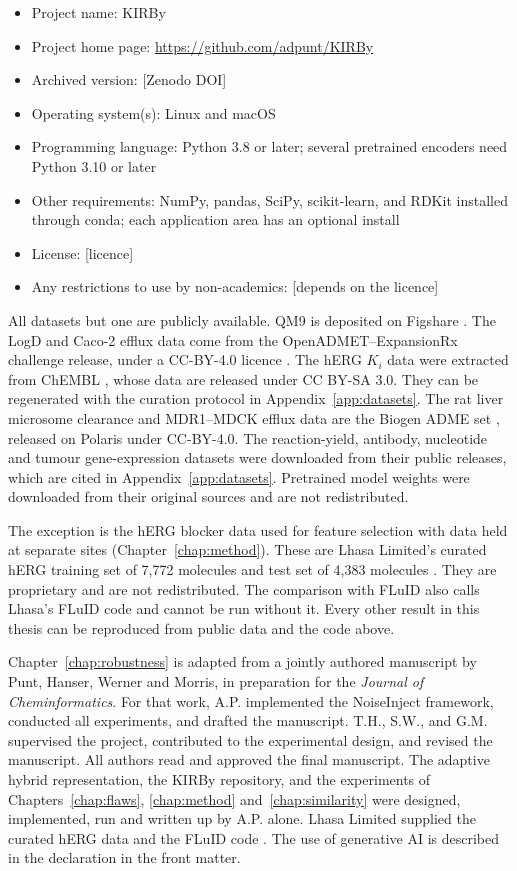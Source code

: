 \begin{itemize}
    \item Project name: KIRBy
    \item Project home page: \url{https://github.com/adpunt/KIRBy}
    \item Archived version: [Zenodo DOI]
    \item Operating system(s): Linux and macOS
    \item Programming language: Python 3.8 or later; several pretrained encoders need Python 3.10 or later
    \item Other requirements: NumPy, pandas, SciPy, scikit-learn, and RDKit installed through conda; each application area has an optional install
    \item License: [licence]
    \item Any restrictions to use by non-academics: [depends on the licence]
\end{itemize}


All datasets but one are publicly available. QM9 \citep{Ramakrishnan2014} is deposited on Figshare \citep{qm9_dataset}. The LogD and Caco-2 efflux data come from the OpenADMET--ExpansionRx challenge release, under a CC-BY-4.0 licence \citep{openadmet}. The hERG $K_i$ data were extracted from ChEMBL \citep{Zdrazil2023}, whose data are released under CC BY-SA 3.0. They can be regenerated with the curation protocol in Appendix~\ref{app:datasets}. The rat liver microsome clearance and MDR1--MDCK efflux data are the Biogen ADME set \citep{fang2023}, released on Polaris \citep{polaris} under CC-BY-4.0. The reaction-yield, antibody, nucleotide and tumour gene-expression datasets were downloaded from their public releases, which are cited in Appendix~\ref{app:datasets}. Pretrained model weights were downloaded from their original sources and are not redistributed.

The exception is the hERG blocker data used for feature selection with data held at separate sites (Chapter~\ref{chap:method}). These are Lhasa Limited's curated hERG training set of 7,772 molecules and test set of 4,383 molecules \citep{Hanser2025}. They are proprietary and are not redistributed. The comparison with FLuID also calls Lhasa's FLuID code and cannot be run without it. Every other result in this thesis can be reproduced from public data and the code above.

Chapter~\ref{chap:robustness} is adapted from a jointly authored manuscript by Punt, Hanser, Werner and Morris, in preparation for the \textit{Journal of Cheminformatics}. For that work, A.P. implemented the NoiseInject framework, conducted all experiments, and drafted the manuscript. T.H., S.W., and G.M. supervised the project, contributed to the experimental design, and revised the manuscript. All authors read and approved the final manuscript. The adaptive hybrid representation, the KIRBy repository, and the experiments of Chapters~\ref{chap:flaws}, \ref{chap:method} and~\ref{chap:similarity} were designed, implemented, run and written up by A.P. alone. Lhasa Limited supplied the curated hERG data and the FLuID code \citep{Hanser2025}. The use of generative AI is described in the declaration in the front matter.
